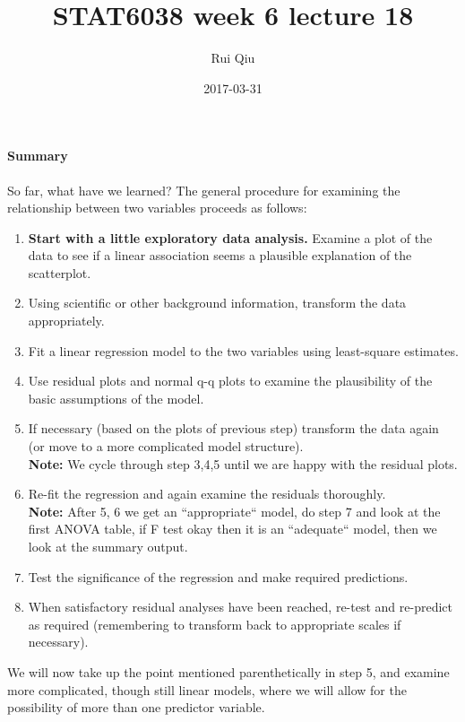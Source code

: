 \documentclass[a4paper, 11pt, twoside]{article}
\begin{document}
\title{STAT6038 week 6 lecture 18}
\author{Rui Qiu}
\date{2017-03-31}

\maketitle

\paragraph{Summary} So far, what have we learned? The general procedure for examining the relationship between two variables proceeds as follows:

\begin{enumerate}
	\item \textbf{Start with a little exploratory data analysis.} Examine a plot of the data to see if a linear association seems a plausible explanation of the scatterplot.
	\item Using scientific or other background information, transform the data appropriately.
	\item Fit a linear regression model to the two variables using least-square estimates.
	\item Use residual plots and normal q-q plots to examine the plausibility of the basic assumptions of the model.
	\item If necessary (based on the plots of previous step) transform the data again (or move to a more complicated model structure).\\
	\textbf{Note:} We cycle through step 3,4,5 until we are happy with the residual plots.
	\item Re-fit the regression and again examine the residuals thoroughly.\\
	\textbf{Note:} After 5, 6 we get an ``appropriate`` model, do step 7 and look at the first ANOVA table, if F test okay then it is an ``adequate`` model, then we look at the summary output.
	\item Test the significance of the regression and make required predictions.
	\item When satisfactory residual analyses have been reached, re-test and re-predict as required (remembering to transform back to appropriate scales if necessary).\\
\end{enumerate}

We will now take up the point mentioned parenthetically in step 5, and examine more complicated, though still linear models, where we will allow for the possibility of more than one predictor variable.
\end{document}
